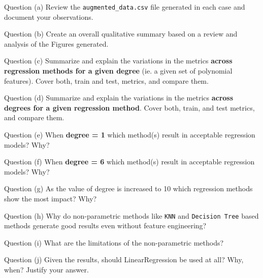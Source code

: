 \clearpage

\begin{customboxnew}[label={box:Q3a}]{Question (a)}
	Review the \verb|augmented_data.csv| file generated in each case and document your observations.
\end{customboxnew}

\begin{customboxnew}[label={box:Q3b}]{Question (b)}
	Create an overall qualitative summary based on a review and analysis of the Figures generated.
\end{customboxnew}

\begin{customboxnew}[label={box:Q3c}]{Question (c)}
	Summarize and explain the variations in the metrics \textbf{across regression methods for a given degree} (ie. a given set of polynomial features). Cover both, train and test, metrics, and compare them.
\end{customboxnew}

\begin{customboxnew}[label={box:Q3d}]{Question (d)}
	Summarize and explain the variations in the metrics \textbf{across degrees for a given regression method}. Cover both, train, and test metrics, and compare them.
\end{customboxnew}

\begin{customboxnew}[label={box:Q3e}]{Question (e)}
	When \textbf{degree = 1} which method(s) result in acceptable regression models? Why?
\end{customboxnew}

\begin{customboxnew}[label={box:Q3f}]{Question (f)}
	When \textbf{degree = 6} which method(s) result in acceptable regression models? Why?
\end{customboxnew}

\begin{customboxnew}[label={box:Q3g}]{Question (g)}
	As the value of degree is increased to 10 which regression methods show the most impact? Why?
\end{customboxnew}

\begin{customboxnew}[label={box:Q3h}]{Question (h)}
	Why do non-parametric methods like \verb|KNN| and \verb|Decision Tree| based methods generate good results even without feature engineering?
\end{customboxnew}

\begin{customboxnew}[label={box:Q3i}]{Question (i)}
	What are the limitations of the non-parametric methods?
\end{customboxnew}

\begin{customboxnew}[label={box:Q3j}]{Question (j)}
	Given the results, should LinearRegression be used at all? Why, when? Justify your answer.
\end{customboxnew}

\clearpage